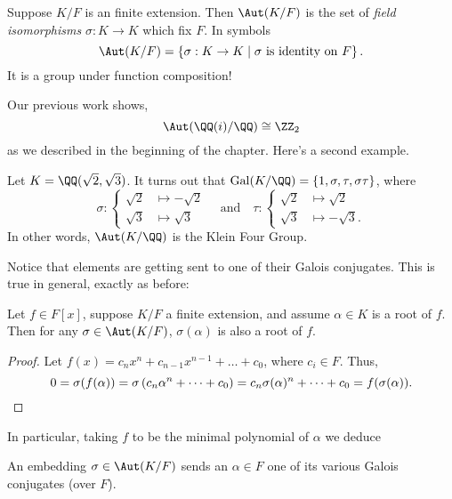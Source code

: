 \begin{definition}
	Suppose $K/F$ is an finite extension.
	Then $\Aut(K/F)$ is the set of \emph{field isomorphisms} $\sigma : K \to K$ which fix $F$.
	In symbols
	\[ \Aut(K/F) =
		\left\{
		\sigma : K \to K \mid
		\text{$\sigma$ is identity on $F$}
	  \right\}.
	\]
	It is a group under function composition!
\end{definition}

Our previous work shows, \[ \Aut(\QQ(i) / \QQ) \cong \Zc 2 \]
as we described in the beginning of the chapter.
Here's a second example.
\begin{example}
	Let $K = \QQ(\sqrt2, \sqrt3)$.
	It turns out that $\Gal(K/\QQ) = \{1, \sigma, \tau, \sigma\tau\}$, where
	\[
		\sigma :
		\begin{cases}
			\sqrt2 &\mapsto -\sqrt2 \\
			\sqrt3 &\mapsto \sqrt3
		\end{cases}
		\quad\text{and}\quad
		\tau :
		\begin{cases}
			\sqrt2 &\mapsto \sqrt2 \\
			\sqrt3 &\mapsto -\sqrt3.
		\end{cases}
	\]
	In other words, $\Aut(K/\QQ)$ is the Klein Four Group.
\end{example}

Notice that elements are getting sent to one of their Galois conjugates.
This is true in general, exactly as before:
\begin{lemma}
	Let $f \in F[x]$, suppose $K/F$ a finite extension, and assume $\alpha \in K$ is a root of $f$.
	Then for any $\sigma \in \Aut(K/F)$, $\sigma(\alpha)$ is also a root of $f$.
	\label{lem:root_shuffle}
\end{lemma}
\begin{proof}
	Let $f(x) = c_nx^n + c_{n-1}x^{n-1} + \dots + c_0$, where $c_i \in F$.
	Thus,
	\[ 0 = \sigma(f(\alpha)) = \sigma\left( c_n\alpha^n + \dots + c_0 \right)
	= c_n\sigma(\alpha)^n + \dots + c_0 = f(\sigma(\alpha)). \qedhere \]
\end{proof}
In particular, taking $f$ to be the minimal polynomial of $\alpha$ we deduce
\begin{moral}
	An embedding $\sigma \in \Aut(K/F)$ sends an $\alpha \in F$
	one of its various Galois conjugates (over $F$).
\end{moral}


